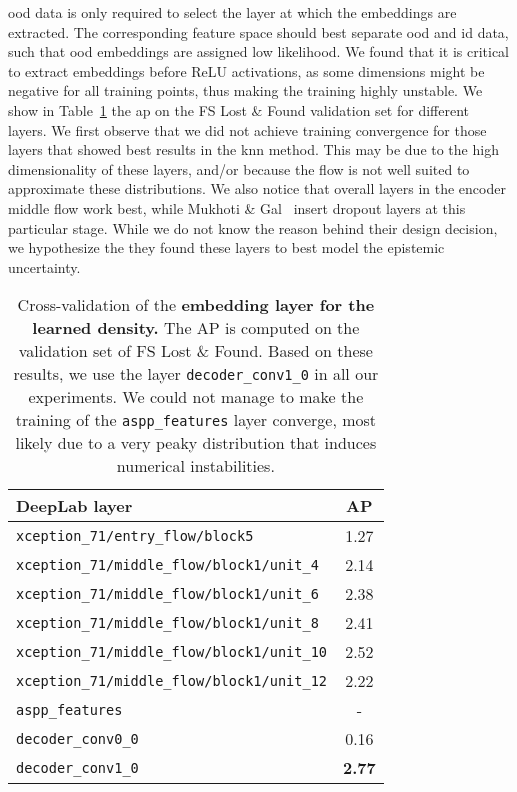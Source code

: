  \ac{ood} data is only required to select the layer at which the embeddings are extracted. The corresponding feature space should best separate \ac{ood} and \ac{id} data, such that \ac{ood} embeddings are assigned low likelihood. We found that it is critical to extract embeddings before ReLU activations, as some dimensions might be negative for all training points, thus making the training highly unstable. We show in Table~\ref{tab:learned:layers} the \ac{ap} on the FS Lost \& Found validation set for different layers. We first observe that we did not achieve training convergence for those layers that showed best results in the k\ac{nn} method. This may be due to the high dimensionality of these layers, and/or because the flow is not well suited to approximate these distributions. We also notice that overall layers in the encoder middle flow work best, while Mukhoti \& Gal~\cite{Mukhoti2018-af} insert dropout layers at this particular stage. While we do not know the reason behind their design decision, we hypothesize the they found these layers to best model the epistemic uncertainty.

\begin{table}[htb]
    \centering
    \footnotesize
    \begin{tabular}{lc}
      \toprule
      DeepLab layer & AP \\
      \midrule
      \scriptsize{\verb|xception_71/entry_flow/block5|} & 1.27 \\
      \scriptsize{\verb|xception_71/middle_flow/block1/unit_4|} & 2.14 \\
      \scriptsize{\verb|xception_71/middle_flow/block1/unit_6|} & 2.38 \\
      \scriptsize{\verb|xception_71/middle_flow/block1/unit_8|} & 2.41 \\
      \scriptsize{\verb|xception_71/middle_flow/block1/unit_10|} & 2.52 \\
      \scriptsize{\verb|xception_71/middle_flow/block1/unit_12|} & 2.22 \\
      \scriptsize{\verb|aspp_features|}                         & - \\
      \scriptsize{\verb|decoder_conv0_0|}                       & 0.16 \\
      \scriptsize{\verb|decoder_conv1_0|}                       & \textbf{2.77} \\
      \bottomrule
    \end{tabular}
    \vspace{3mm}
    \caption{Cross-validation of the \textbf{embedding layer for the learned density.} The AP is computed on the validation set of FS Lost \& Found. Based on these results, we use the layer \texttt{decoder\_conv1\_0} in all our experiments. We could not manage to make the training of the \texttt{aspp\_features} layer converge, most likely due to a very peaky distribution that induces numerical instabilities.}
    \label{tab:learned:layers}
\end{table}

